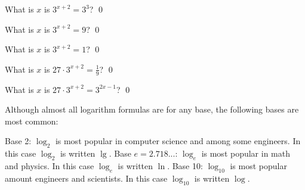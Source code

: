\begin{ex} 
What is $x$ is $3^{x + 2} = 3^3$?
\qed
\end{ex}

\begin{ex} 
What is $x$ is $3^{x + 2} = 9$?
\qed
\end{ex}

\begin{ex} 
What is $x$ is $3^{x + 2} = 1$?
\qed
\end{ex}

\begin{ex} 
What is $x$ is $27 \cdot 3^{x + 2} = \frac{1}{9}$?
\qed
\end{ex}

\begin{ex} 
What is $x$ is $27 \cdot 3^{x + 2} = 3^{2x - 1}$?
\qed
\end{ex}

Although almost all logarithm formulas are for any base,
the following bases are most common:
\begin{enumerate}
  \li Base 2: $\log_{2}$ is most popular in computer science and among some engineers.
  In this case $\log_2$ is written $\lg$.
  \li Base $e = 2.718...$: $\log_{e}$ is most popular in math and physics.
    In this case $\log_e$ is written $\ln$.
  \li Base 10: $\log_{10}$ is most popular amount engineers and scientists.
  In this case $\log_{10}$ is written $\log$.
\end{enumerate}
